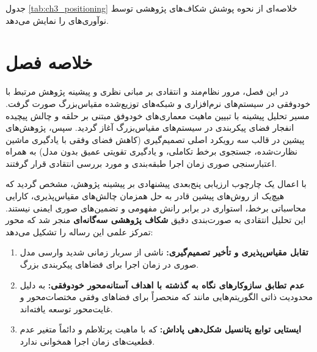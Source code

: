 \documentclass[oneside,openany,phd]{TMU-Thesis}
\begin{document}
جدول \ref{tab:ch3_positioning} خلاصه‌ای از نحوه پوشش شکاف‌های پژوهشی توسط نوآوری‌های  را نمایش می‌دهد.

\begin{table}[htbp]
\centering
\caption{نحوه پوشش شکاف‌های پژوهشی توسط نوآوری‌های معماری پیشنهادی }
\label{tab:ch3_positioning}
\end{table}

\section{خلاصه فصل}
\label{sec:ch3_summary}

در این فصل، مرور نظام‌مند و انتقادی بر مبانی نظری و پیشینه پژوهش مرتبط با خودوفقی در سیستم‌های نرم‌افزاری و شبکه‌های توزیع‌شده مقیاس‌بزرگ صورت گرفت. مسیر تحلیل پیشینه با تبیین ماهیت معماری‌های خودوفق مبتنی بر حلقه  و چالش پیچیده انفجار فضای پیکربندی در سیستم‌های مقیاس‌بزرگ آغاز گردید. سپس، پژوهش‌های پیشین در قالب سه رویکرد اصلی تصمیم‌گیری (کاهش فضای وفقی با یادگیری ماشین نظارت‌شده، جستجوی برخط تکاملی، و یادگیری تقویتی عمیق بدون مدل) به همراه اعتبارسنجی صوری زمان اجرا طبقه‌بندی و مورد بررسی انتقادی قرار گرفتند.

با اعمال یک چارچوب ارزیابی پنج‌بعدی پیشنهادی بر پیشینه پژوهش، مشخص گردید که هیچ‌یک از روش‌های پیشین قادر به حل همزمان چالش‌های مقیاس‌پذیری، کارایی محاسباتی برخط، استواری در برابر رانش مفهومی و تضمین‌های صوری ایمنی نیستند. این تحلیل انتقادی به صورت‌بندی دقیق \textbf{شکاف پژوهشی سه‌گانه‌ای} منجر شد که محور تمرکز علمی این رساله را تشکیل می‌دهد:
\begin{enumerate}
    \item \textbf{تقابل مقیاس‌پذیری و تأخیر تصمیم‌گیری:} ناشی از سربار زمانی شدید وارسی مدل صوری در زمان اجرا برای فضاهای پیکربندی بزرگ.
    \item \textbf{عدم تطابق سازوکارهای نگاه به گذشته با اهداف آستانه‌محور خودوفقی:} به دلیل محدودیت ذاتی الگوریتم‌هایی مانند  که منحصراً برای فضاهای وفقی مختصات‌محور و غایت‌محور توسعه یافته‌اند.
    \item \textbf{ایستایی توابع پتانسیل شکل‌دهی پاداش:} که با ماهیت پرتلاطم و دائماً متغیر عدم قطعیت‌های زمان اجرا همخوانی ندارد.
\end{enumerate}
\end{document}
